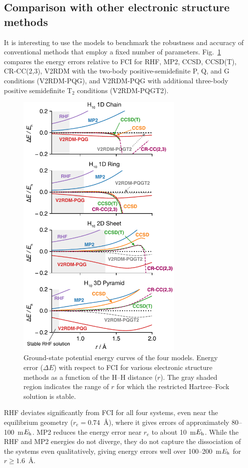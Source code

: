 \documentclass[aip,jcp,amsmath,amssymb, preprint]{revtex4-1}
\newcommand*{\Eh}{$E_{\rm h}$\xspace}
\newcommand{\add}[1]{\colorbox{goodgreen}{\textcolor{white}{\footnotesize  \fontfamily{phv}\selectfont +}}
    \textcolor{goodgreen}{{#1}}\xspace}
\begin{document}
\subsection{\label{sec:trad_methods}Comparison with other electronic structure methods}

It is interesting to use the  models to benchmark the robustness and accuracy of conventional  methods that employ a fixed number of parameters.
Fig.~\ref{fig:comon_method_errors} compares the energy errors relative to FCI for RHF, MP2, CCSD, CCSD(T), \add{CR-CC(2,3),} V2RDM with the two-body positive-semidefinite P, Q, and G conditions (V2RDM-PQG), and V2RDM-PQG with additional three-body positive semidefinite T$_2$ conditions (V2RDM-PQGT2).
\begin{figure}[h!]
\centering
\includegraphics[width=3.2in]{figure_6.pdf}
\caption{Ground-state potential energy curves of the four  models. Energy error ($\Delta E$) with respect to FCI for various electronic structure methods as a function of the H--H distance ($r$). The gray shaded region indicates the range of $r$ for which the restricted Hartree--Fock solution is stable.}
\label{fig:comon_method_errors}
\end{figure}
RHF deviates significantly from FCI for all four systems, even near the  equilibrium geometry ($r_e=0.74$~{\AA}), where it gives errors of approximately 80--100~m\Eh. 
MP2 reduces the energy error near $r_e$ to about 10~m\Eh.   
While the RHF and MP2 energies do not diverge, they do not capture the dissociation of the  systems even qualitatively, giving energy errors well over 100--200~m\Eh for $r\geq1.6$~{\AA}. 
\end{document}

